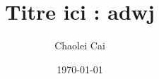 \documentclass[12pt, letterpaper]{article}
\title{Titre ici : adwj}
\author{Chaolei Cai
\\
    \multicolumn{1}{
        p{.7\textwidth}}{\centering\emph{Université Paris Vincennes St-Denis\\
  UFR mathématiques, informatique, technologies sciences de l'information\\}
  L3 Informatique}
}
\date{\today}
\begin{document}
\begin{titlepage}
    \maketitle
\end{titlepage}

\tableofcontents


\end{document}
